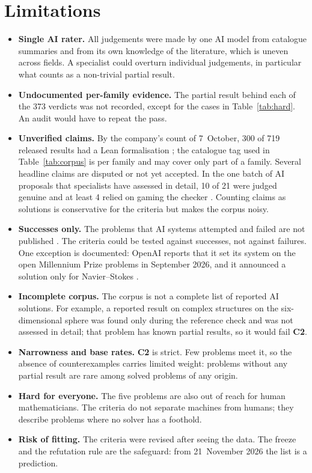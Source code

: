 \documentclass[11pt,a4paper]{article}
\theoremstyle{prob}
\newcommand{\Ctwo}{\textbf{C2}}
\begin{document}
\section{Limitations}\label{sec:limits}

\begin{itemize}
\item \textbf{Single AI rater.} All judgements were made by one AI model from catalogue summaries and from its own knowledge of the literature, which is uneven across fields. A specialist could overturn individual judgements, in particular what counts as a non-trivial partial result.
\item \textbf{Undocumented per-family evidence.} The partial result behind each of the 373 verdicts was not recorded, except for the cases in Table~\ref{tab:hard}. An audit would have to repeat the pass.
\item \textbf{Unverified claims.} By the company's count of 7~October, 300 of 719 released results had a Lean formalisation \cite{kingy}; the catalogue tag used in Table~\ref{tab:corpus} is per family and may cover only part of a family. Several headline claims are disputed or not yet accepted. In the one batch of AI proposals that specialists have assessed in detail, 10 of 21 were judged genuine and at least 4 relied on gaming the checker \cite{combi}. Counting claims as solutions is conservative for the criteria but makes the corpus noisy.
\item \textbf{Successes only.} The problems that AI systems attempted and failed are not published \cite{taoicm}. The criteria could be tested against successes, not against failures. One exception is documented: OpenAI reports that it set its system on the open Millennium Prize problems in September 2026, and it announced a solution only for Navier--Stokes \cite{nsopenai}.
\item \textbf{Incomplete corpus.} The corpus is not a complete list of reported AI solutions. For example, a reported result on complex structures on the six-dimensional sphere \cite{sixsphere} was found only during the reference check and was not assessed in detail; that problem has known partial results, so it would fail \Ctwo.
\item \textbf{Narrowness and base rates.} \Ctwo{} is strict. Few problems meet it, so the absence of counterexamples carries limited weight: problems without any partial result are rare among solved problems of any origin.
\item \textbf{Hard for everyone.} The five problems are also out of reach for human mathematicians. The criteria do not separate machines from humans; they describe problems where no solver has a foothold.
\item \textbf{Risk of fitting.} The criteria were revised after seeing the data. The freeze and the refutation rule are the safeguard: from 21~November 2026 the list is a prediction.
\end{itemize}
\end{document}
